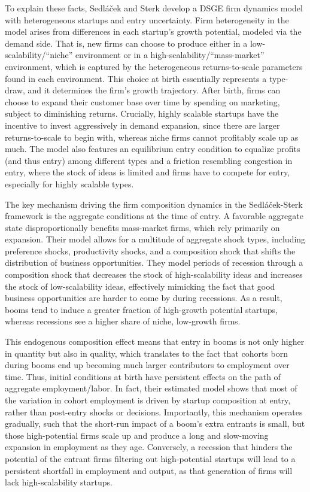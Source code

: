 \documentclass[a4paper,12pt]{article} %
\numberwithin{equation}{section} %
\numberwithin{figure}{section}
\numberwithin{table}{section}
\begin{document}
To explain these facts, Sedláček and Sterk develop a DSGE firm dynamics model with heterogeneous startups and entry uncertainty. Firm heterogeneity in the model arises
from differences in each startup's growth potential, modeled via the demand side. That is, new firms can choose to produce either in a low-scalability/``niche'' 
environment or in a high-scalability/``mass-market'' environment, which is captured by the heterogeneous returns-to-scale parameters found in each environment. 
This choice at birth essentially represents a type-draw, and it determines the firm's growth trajectory. After birth, firms can choose to expand their customer 
base over time by spending on marketing, subject to diminishing returns. Crucially, highly scalable startups have the incentive to invest aggressively in demand
expansion, since there are larger returns-to-scale to begin with, whereas niche firms cannot profitably scale up as much. 
The model also features an equilibrium entry condition to equalize profits (and thus entry) among different types and a friction resembling congestion in entry,
where the stock of ideas is limited and firms have to compete for entry, especially for highly scalable types.

The key mechanism driving the firm composition dynamics in the Sedláček-Sterk framework is the aggregate conditions at the time of entry. 
A favorable aggregate state disproportionally benefits mass-market firms, which rely primarily on expansion. 
Their model allows for a multitude of aggregate shock types, including preference shocks, productivity shocks, and a composition shock that shifts the distribution of business opportunities. 
They model periods of recession through a composition shock that decreases the stock of high-scalability ideas and increases the stock of 
low-scalability ideas, effectively mimicking the fact that good business opportunities are harder to come by during recessions. As a result, 
booms tend to induce a greater fraction of high-growth potential startups, whereas recessions see a higher share of niche, low-growth firms. 

This endogenous composition effect means that entry in booms is not only higher in quantity but also in quality, which translates to the 
fact that cohorts born during booms end up becoming much larger contributors to employment over time. Thus, initial conditions at birth 
have persistent effects on the path of aggregate employment/labor. In fact, their estimated model shows that most of the variation in 
cohort employment is driven by startup composition at entry, rather than post-entry shocks or decisions. Importantly, this mechanism 
operates gradually, such that the short-run impact of a boom's extra entrants is small, but those high-potential firms scale up and 
produce a long and slow-moving expansion in employment as they age. Conversely, a recession that hinders the potential of the entrant 
firms filtering out high-potential startups will lead to a persistent shortfall in employment and output, as that generation of firms will lack 
high-scalability startups.
\end{document}
